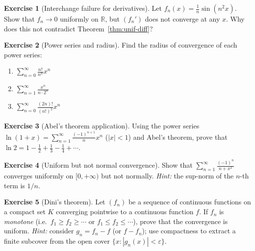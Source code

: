 \documentclass[12pt,a4paper]{book}
\theoremstyle{definition}
\newtheorem{exercise}{Exercise}[chapter]
\newcommand{\R}{\mathbb{R}}
\newcommand{\eps}{\varepsilon}
\newcommand{\abs}[1]{\left\lvert #1 \right\rvert}
\begin{document}
\begin{exercise}[Interchange failure for derivatives]\label{exo:exer-diff-fail}
  Let $f_n(x)=\frac{1}{n}\sin(n^2 x)$.  Show that $f_n\to0$ uniformly
  on $\R$, but $(f_n')$ does not converge at any $x$.  Why does this not
  contradict Theorem~\ref{thm:unif-diff}?
\end{exercise}

\begin{exercise}[Power series and radius]\label{exo:exer-radius}
  Find the radius of convergence of each power series:
  \begin{enumerate}[label=(\alph*)]
    \item $\displaystyle\sum_{n=0}^{\infty}\frac{n!}{n^n}x^n$
    \item $\displaystyle\sum_{n=1}^{\infty}\frac{x^n}{n\cdot 2^n}$
    \item $\displaystyle\sum_{n=0}^{\infty}\frac{(2n)!}{(n!)^2}x^n$
  \end{enumerate}
\end{exercise}

\begin{exercise}[Abel's theorem application]\label{exo:exer-abel}
  Using the power series $\ln(1+x)=\sum_{n=1}^{\infty}\frac{(-1)^{n+1}}{n}x^n$
  ($\abs{x}<1$) and Abel's theorem, prove that
  $\ln 2=1-\frac{1}{2}+\frac{1}{3}-\frac{1}{4}+\cdots$.
\end{exercise}

\begin{exercise}[Uniform but not normal convergence]\label{exo:exer-unif-not-normal}
  Show that $\sum_{n=1}^{\infty}\frac{(-1)^n}{n+x^2}$ converges
  uniformly on $[0,+\infty)$ but not normally.
  \emph{Hint:} the sup-norm of the $n$-th term is $1/n$.
\end{exercise}

\begin{exercise}[Dini's theorem]\label{exo:exer-dini}
  Let $(f_n)$ be a sequence of continuous functions on a compact set
  $K$ converging pointwise to a continuous function $f$.  If $f_n$
  is \emph{monotone} (i.e.\ $f_1\ge f_2\ge\cdots$ or
  $f_1\le f_2\le\cdots$), prove that the convergence is uniform.
  \emph{Hint:} consider $g_n=f_n-f$ (or $f-f_n$); use compactness to
  extract a finite subcover from the open cover
  $\{x:\abs{g_n(x)}<\eps\}$.
\end{exercise}
\end{document}
